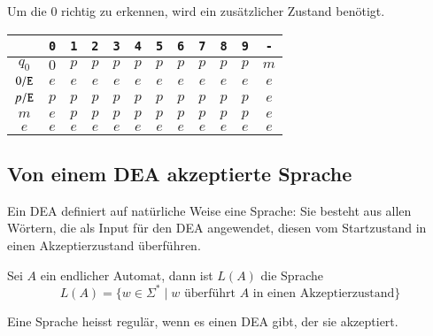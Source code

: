 \begin{beispiel} Um die $0$ richtig zu erkennen,
wird ein zusätzlicher Zustand benötigt.

\begin{center}
\begin{tabular}{|c|ccccccccccc|}
\hline
&\tt 0&\tt 1&\tt 2&\tt 3&\tt 4&\tt 5&\tt 6&\tt 7&\tt 8&\tt 9&\tt -\\
\hline
$q_0$&$0$&$p$&$p$&$p$&$p$&$p$&$p$&$p$&$p$&$p$&$m$\\
$0{\tt /E}$&$e$&$e$&$e$&$e$&$e$&$e$&$e$&$e$&$e$&$e$&$e$\\
$p{\tt /E}$&$p$&$p$&$p$&$p$&$p$&$p$&$p$&$p$&$p$&$p$&$e$\\
$m$&$e$&$p$&$p$&$p$&$p$&$p$&$p$&$p$&$p$&$p$&$e$\\
$e$&$e$&$e$&$e$&$e$&$e$&$e$&$e$&$e$&$e$&$e$&$e$\\
\hline
\end{tabular}
\end{center}

\end{beispiel}

\subsection{Von einem DEA akzeptierte Sprache\label{regulaer:akzeptiertesprache}}
Ein DEA definiert auf natürliche Weise eine Sprache: Sie besteht aus
allen Wörtern, die als Input für den DEA angewendet, diesen vom
Startzustand in einen Akzeptierzustand überführen.

\begin{definition}
Sei $A$ ein endlicher Automat, dann ist $L(A)$ die Sprache
\[
L(A)=\{w\in\Sigma^*\;|\; \text{$w$ überführt $A$ in einen Akzeptierzustand}\}
\]
\end{definition}

\begin{definition}
\label{regulaer:definition:regulaere-sprache}
Eine Sprache heisst regulär, wenn es einen DEA gibt, der sie
akzeptiert.
\end{definition}

